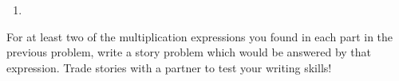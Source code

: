 \documentclass{ximera}
\begin{document}
\begin{problem}
\begin{enumerate}
{\begin{tabular}{p{0.5cm}p{0.5cm}p{0.5cm}p{0.5cm}p{0.5cm}p{0.5cm}p{0.5cm}p{0.5cm}p{0.5cm}p{0.5cm}p{0.5cm}}
        \end{tabular} }
    \item \leavevmode\vadjust{\vspace{-\baselineskip}}
\end{enumerate}
\end{problem}

\begin{problem}
 For at least two of the multiplication expressions you found in each part in the previous problem, write a story problem which would be answered by that expression.  Trade stories with a partner to test your writing skills!
\end{problem}
\end{document}
